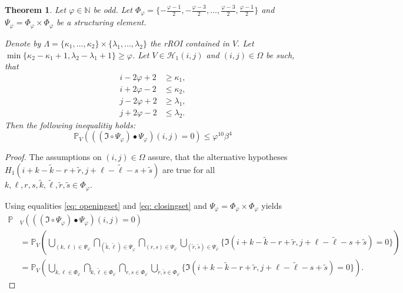 \documentclass[a4paper,12pt]{article}
\theoremstyle{plain}
\newtheorem{theorem}{Theorem}[section]
\theoremstyle{definition}
\begin{document}
\begin{appendix}
\begin{theorem}
		Let $\varphi \in \mathbb{N}$ be odd. Let $\Phi_\varphi = \{ -\frac{\varphi - 1}{2}, -\frac{\varphi - 3}{2}, \dots, \frac{\varphi - 3}{2}, \frac{\varphi - 1}{2} \}$ and $\Psi_\varphi = \Phi_\varphi \times \Phi_\varphi$ be a structuring element.
		
		Denote by $\varLambda = \{ \kappa_1, \dots, \kappa_2 \} \times \{ \lambda_1, \dots, \lambda_2 \}$ the rROI contained in $V$. Let $\min \{ \kappa_2 - \kappa_1 + 1, \lambda_2 - \lambda_1 + 1 \} \geq \varphi$. Let $V \in \mathcal{H}_1(i, j)$ and $(i, j) \in \Omega$ be such, that
		\begin{equation}
			\begin{aligned}
				i - 2 \varphi + 2 &\geq \kappa_1, \\
				i + 2 \varphi - 2 &\leq \kappa_2, \\
				j - 2 \varphi + 2 &\geq \lambda_1, \\
				j + 2 \varphi - 2 &\leq \lambda_2.
			\end{aligned}
		\end{equation}
		Then the following inequalitiy holds:
		\begin{equation}
			\mathbb{P}_V\left( ((\mathfrak{I} \circ \Psi_\varphi) \bullet \Psi_\varphi)(i, j) = 0 \right) \leq \varphi^{10} \beta^4
		\end{equation}
	\end{theorem}
	\begin{proof}
		The assumptions on $(i, j) \in \Omega$ assure, that the alternative hypotheses $H_1(i + k - \tilde{k} - r + \tilde{r}, j + \ell - \tilde{\ell} - s + \tilde{s})$ are true for all $k, \ell, r, s, \tilde{k}, \tilde{\ell}, \tilde{r}, \tilde{s} \in \Phi_\varphi$.
		
		Using equalities \eqref{eq: openingset} and \eqref{eq: closingset} and $\Psi_\varphi = \Phi_\varphi \times \Phi_\varphi$ yields
		\begin{align*}
			\mathbb{P}&_V\left( ((\mathfrak{I} \circ \Psi_\varphi) \bullet \Psi_\varphi)(i, j) = 0 \right) \\
			&= \mathbb{P}_V\left( \bigcup_{(k, \ell) \in \Psi_\varphi} \bigcap_{(\tilde{k}, \tilde{\ell}) \in \Psi_\varphi} \bigcap_{(r, s) \in \Psi_\varphi} \bigcup_{(\tilde{r}, \tilde{s}) \in \Psi_\varphi} \{ \mathfrak{I}(i + k - \tilde{k} - r + \tilde{r}, j + \ell - \tilde{\ell} - s + \tilde{s}) = 0 \} \right) \\
			&= \mathbb{P}_V\left( \bigcup_{k, \ell \in \Phi_\varphi} \bigcap_{\tilde{k}, \tilde{\ell} \in \Phi_\varphi} \bigcap_{r, s \in \Phi_\varphi} \bigcup_{\tilde{r}, \tilde{s} \in \Phi_\varphi} \{ \mathfrak{I}(i + k - \tilde{k} - r + \tilde{r}, j + \ell - \tilde{\ell} - s + \tilde{s}) = 0 \} \right).
		\end{align*}
		

\end{proof}
\end{appendix}
\end{document}

